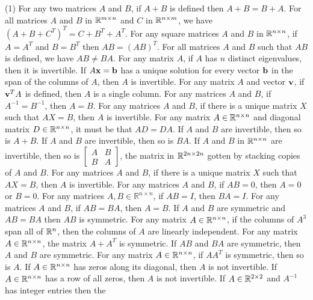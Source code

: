 \begin{tasks}[resume, style=enumerate](1)
\task
  For any two matrices $A$ and $B$, if $A + B$ is defined then $A + B
  = B + A$.
\task
  For all matrices $A$ and $B$ in $\mathbb R^{m \times n}$ and $C$ in $\mathbb R^{n
    \times m}$, we have $(A + B + C^T)^T = C + B^T + A^T$.
\task
  For any square matrices $A$ and $B$ in $\mathbb R^{n \times n}$, if $A =
  A^T$ and $B = B^T$ then $AB = (AB)^T$.
\task
  For all matrices $A$ and $B$ such that $AB$ is defined, we have $AB
  \not = BA$.
\task
  For any matrix $A$, if $A$ has $n$ distinct eigenvalues, then it is
  invertible.
\task
  If $A\mathbf x = \mathbf b$ has a unique solution for every vector $\mathbf b$ in the
  span of the columns of $A$, then $A$ is invertible.
\task
  For any matrix $A$ and vector $\mathbf v$, if $\mathbf v^T A$ is defined, then
  $A$ is a single column.
\task
  For any matrices $A$ and $B$, if $A^{-1} = B^{-1}$, then $A = B$.
\task
  For any matrices $A$ and $B$, if there is a unique matrix $X$ such
  that $AX = B$, then $A$ is invertible.
\task
  For any matrix $A \in \mathbb R^{n \times n}$ and diagonal matrix $D \in
  \mathbb R^{n \times n}$, it must be that $AD = DA$.
\task
  If $A$ and $B$ are invertible, then so is $A + B$.
\task
  If $A$ and $B$ are invertible, then so is $BA$.
\task
  If $A$ and $B$ in $\mathbb R^{n \times n}$ are invertible, then so is
  $\begin{bmatrix}A & B \\ B & A\end{bmatrix}$, the matrix in $\mathbb R^{2n
      \times 2n}$ gotten by stacking copies of $A$ and $B$.
\task
  For any matrices $A$ and $B$, if there is a unique matrix $X$ such
  that $AX = B$, then $A$ is invertible.
\task
  For any matrices $A$ and $B$, if $AB = 0$, then $A = 0$ or $B = 0$.
\task
  For any matrices $A, B \in \mathbb R^{n \times n}$, if $AB = I$, then $BA = I$.
\task
  For any matrices $A$ and $B$, if $AB = BA$, then $A = B$.
\task
  If $A$ and $B$ are symmetric and $AB = BA$ then $AB$ is symmetric.
\task
  For any matrix $A \in \mathbb R^{n \times n}$, if the columns of $A^3$ span
  all of $\mathbb R^n$, then the columns of $A$ are linearly independent.
\task
  For any matrix $A \in \mathbb R^{n \times n}$, the matrix $A + A^T$ is
  symmetric.
\task
  If $AB$ and $BA$ are symmetric, then $A$ and $B$ are symmetric.
\task
  For any matrix $A \in \mathbb R^{n \times n}$, if $AA^T$ is
  symmetric, then so is $A$.
\task
  If $A \in \mathbb R^{n \times n}$ has zeros along its diagonal, then $A$ is
  not invertible.
\task
  If $A \in \mathbb R^{n \times n}$ has a row of all zeros, then $A$ is not
  invertible.
\task
  If $A \in \mathbb R^{2 \times 2}$ and $A^{-1}$ has integer entries then the

\end{tasks}

